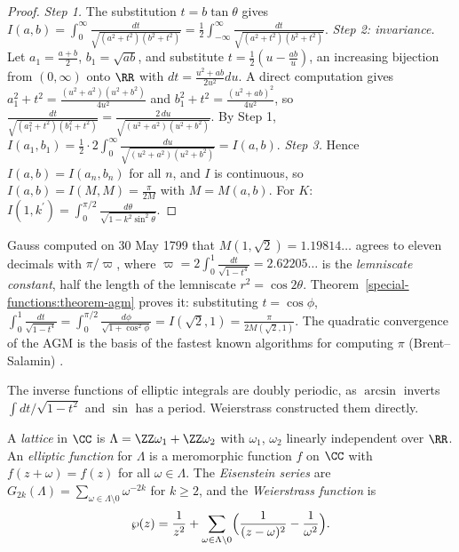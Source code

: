 \begin{proof}
\emph{Step 1.} The substitution $t = b\tan\theta$ gives $I(a, b) = \int_0^\infty\frac{dt}{\sqrt{(a^2 + t^2)(b^2 + t^2)}} = \frac12\int_{-\infty}^\infty\frac{dt}{\sqrt{(a^2 + t^2)(b^2 + t^2)}}$.
\emph{Step 2: invariance.} Let $a_1 = \frac{a + b}{2}$, $b_1 = \sqrt{ab}$, and substitute $t = \frac12(u - \frac{ab}{u})$, an increasing bijection from $(0, \infty)$ onto $\RR$ with $dt = \frac{u^2 + ab}{2u^2}du$. A direct computation gives
$a_1^2 + t^2 = \frac{(u^2 + a^2)(u^2 + b^2)}{4u^2}$ and $b_1^2 + t^2 = \frac{(u^2 + ab)^2}{4u^2}$, so $\frac{dt}{\sqrt{(a_1^2 + t^2)(b_1^2 + t^2)}} = \frac{2\,du}{\sqrt{(u^2 + a^2)(u^2 + b^2)}}$. By Step 1,
$I(a_1, b_1) = \frac12\cdot 2\int_0^\infty\frac{du}{\sqrt{(u^2 + a^2)(u^2 + b^2)}} = I(a, b)$.
\emph{Step 3.} Hence $I(a, b) = I(a_n, b_n)$ for all $n$, and $I$ is continuous, so $I(a, b) = I(M, M) = \frac{\pi}{2M}$ with $M = M(a, b)$. For $K$: $I(1, k^{\prime}) = \int_0^{\pi/2}\frac{d\theta}{\sqrt{1 - k^2\sin^2\theta}}$.
\end{proof}

\begin{example}\label{special-functions:example-lemniscate}
Gauss computed on 30 May 1799 that $M(1, \sqrt2) = 1.19814\ldots$ agrees to eleven decimals with $\pi/\varpi$, where $\varpi = 2\int_0^1\frac{dt}{\sqrt{1 - t^4}} = 2.62205\ldots$ is the \emph{lemniscate constant}, half the
length of the lemniscate $r^2 = \cos 2\theta$. Theorem~\ref{special-functions:theorem-agm} proves it: substituting $t = \cos\phi$, $\int_0^1\frac{dt}{\sqrt{1 - t^4}} = \int_0^{\pi/2}\frac{d\phi}{\sqrt{1 + \cos^2\phi}} = I(\sqrt2, 1) = \frac{\pi}{2M(\sqrt2, 1)}$.
The quadratic convergence of the AGM is the basis of the fastest known algorithms for computing $\pi$ (Brent--Salamin) \cite{borwein-pi-agm}.
\end{example}

The inverse functions of elliptic integrals are doubly periodic, as $\arcsin$ inverts $\int dt/\sqrt{1 - t^2}$ and $\sin$ has a period. Weierstrass constructed them directly.

\begin{definition}\label{special-functions:definition-lattice}
A \emph{lattice} in $\CC$ is $\Lambda = \ZZ\omega_1 + \ZZ\omega_2$ with $\omega_1$, $\omega_2$ linearly independent over $\RR$. An \emph{elliptic function} for $\Lambda$ is a meromorphic function $f$ on $\CC$ with $f(z + \omega) = f(z)$ for
all $\omega \in \Lambda$. The \emph{Eisenstein series} are $G_{2k}(\Lambda) = \sum_{\omega \in \Lambda \setminus 0}\omega^{-2k}$ for $k \geq 2$, and the \emph{Weierstrass function} is
\[
\wp(z) = \frac{1}{z^2} + \sum_{\omega \in \Lambda \setminus 0}\Bigl(\frac{1}{(z - \omega)^2} - \frac{1}{\omega^2}\Bigr).
\]
\end{definition}

